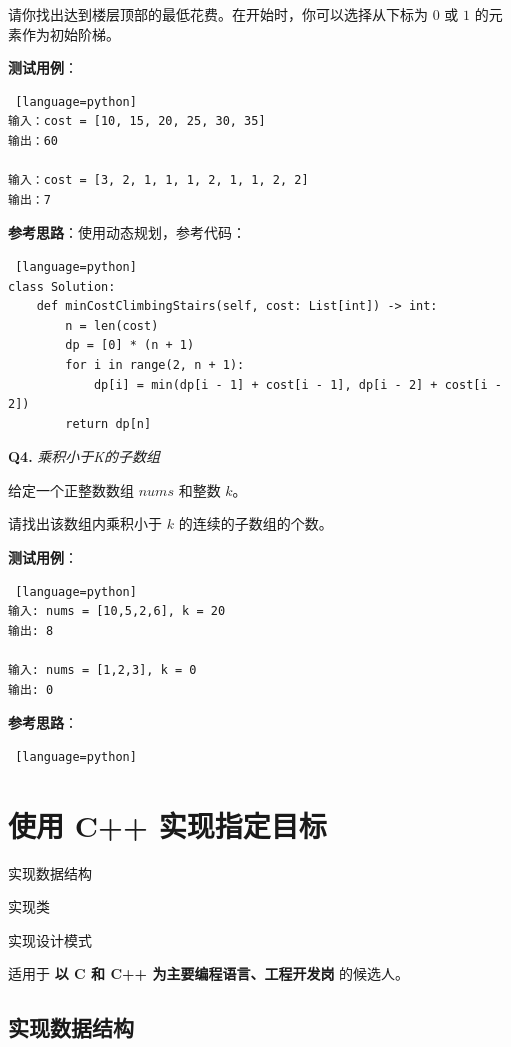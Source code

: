 \documentclass[cn,10pt,math=newtx,citestyle=gb7714-2015,bibstyle=gb7714-2015]{elegantbook}
\begin{document}
请你找出达到楼层顶部的最低花费。在开始时，你可以选择从下标为 $0$ 或 $1$ 的元素作为初始阶梯。


\textbf{测试用例}：
\begin{lstlisting} [language=python]
输入：cost = [10, 15, 20, 25, 30, 35]
输出：60

输入：cost = [3, 2, 1, 1, 1, 2, 1, 1, 2, 2]
输出：7
\end{lstlisting}

\textbf{参考思路}：使用动态规划，参考代码：

\begin{lstlisting} [language=python]
class Solution:
    def minCostClimbingStairs(self, cost: List[int]) -> int:
        n = len(cost)
        dp = [0] * (n + 1)
        for i in range(2, n + 1):
            dp[i] = min(dp[i - 1] + cost[i - 1], dp[i - 2] + cost[i - 2])
        return dp[n]
\end{lstlisting}


\textbf{Q4.} \textit{乘积小于K的子数组}

给定一个正整数数组 $nums$ 和整数 $k$。

请找出该数组内乘积小于 $k$ 的连续的子数组的个数。


\textbf{测试用例}：
\begin{lstlisting} [language=python]
输入: nums = [10,5,2,6], k = 20
输出: 8

输入: nums = [1,2,3], k = 0
输出: 0
\end{lstlisting}

\textbf{参考思路}：

\begin{lstlisting} [language=python]

\end{lstlisting}

\newpage


\section{使用 C++ 实现指定目标}

\begin{introduction}
\item 实现数据结构
\item 实现类
\item 实现设计模式
\end{introduction}

适用于 \textbf{以 C 和 C++ 为主要编程语言、工程开发岗} 的候选人。

\subsection{实现数据结构}
\end{document}
